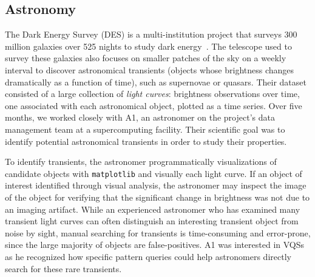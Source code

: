  \subsection{Astronomy}
 \par\noindent{} 
 \npar The Dark Energy Survey (DES) is a multi-institution project that surveys 300 million galaxies over 525 nights to study dark energy~\cite{DrlicaWagner2018}. The telescope used to survey these galaxies also focuses on smaller patches of the sky on a weekly interval to discover astronomical transients (objects whose brightness changes dramatically as a function of time), such as supernovae or quasars. Their dataset consisted of a large collection of \emph{light curves}: brightness observations over time, one associated with each astronomical object, plotted as a time series. Over five months, we worked closely with A1, an astronomer on the project's data management team at a supercomputing facility. Their scientific goal was to identify potential astronomical transients in order to study their properties. 
 \par\noindent{} 
 \npar {} To identify transients, the astronomer programmatically  visualizations of candidate objects with \texttt{matplotlib} and visually  each light curve. If an object of interest  identified through visual analysis, the astronomer may inspect the image of the object for verifying that the significant change in brightness was not due to an imaging artifact. While an experienced astronomer who has examined many transient light curves can often distinguish an interesting transient object from noise by sight, manual searching for transients is time-consuming and error-prone, since the large majority of objects are false-positives. A1 was interested in VQSs as he recognized how specific pattern queries could help astronomers directly search for these rare transients.
